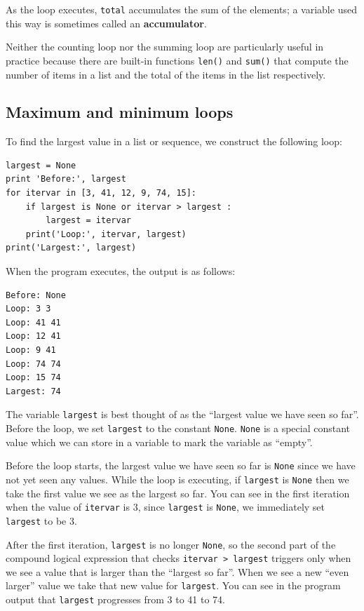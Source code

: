 As the loop executes, {\tt total} accumulates the sum of the
elements; a variable used this way is sometimes called an
{\bf accumulator}.

Neither the counting loop nor the summing loop are particularly 
useful in practice because there are built-in functions 
{\tt len()} and {\tt sum()} that compute the number of 
items in a list and the total of the items in the list
respectively.

\subsection{Maximum and minimum loops}

\label{maximumloop}
To find the largest value in a list or sequence, we construct the
following loop:

\beforeverb
\begin{verbatim}
largest = None
print 'Before:', largest
for itervar in [3, 41, 12, 9, 74, 15]:
    if largest is None or itervar > largest :
        largest = itervar
    print('Loop:', itervar, largest)
print('Largest:', largest)
\end{verbatim}
\afterverb
%
When the program executes, the output is as follows:

\beforeverb
\begin{verbatim}
Before: None
Loop: 3 3
Loop: 41 41
Loop: 12 41
Loop: 9 41
Loop: 74 74
Loop: 15 74
Largest: 74
\end{verbatim}
\afterverb
%
The variable {\tt largest} is best thought of as 
the ``largest value we have seen so far''.
Before the loop, we set {\tt largest} to the constant {\tt None}.  
{\tt None} is a special constant value which we can 
store in a variable to mark 
the variable as ``empty''.  

Before the loop starts, the largest value we have seen so far 
is {\tt None} since we have not yet seen any values.  While the 
loop is executing, if {\tt largest} is {\tt None} then we take
the first value we see as the largest so far.   You can see in 
the first iteration when the value of {\tt itervar} is 3,
since {\tt largest} is {\tt None}, we immediately set 
{\tt largest} to be 3.

After the first iteration, {\tt largest} is no longer {\tt None},
so the second part of the compound logical expression that checks
{\tt itervar > largest} triggers only when we see a value that is
larger than the ``largest so far''.  When we see a new ``even larger''
value we take that new value for {\tt largest}.  You can see in the 
program output that {\tt largest} progresses from 3 to 41 to 74.

